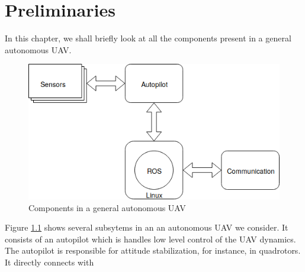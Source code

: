 
\chapter{Preliminaries} %

\label{Chapter5} %


In this chapter, we shall briefly look at all the components present in a general autonomous UAV.

\begin{figure}[h]
	\centering
	\includegraphics[scale=0.8]{Pictures/uav.png}
	\caption{Components in a general autonomous UAV}
	\label{fig: uav}
\end{figure}

Figure \ref{fig: uav} shows several subsytems in an an autonomous UAV we consider. It consists of an autopilot which is handles low level control of the UAV dynamics. The autopilot is responsible for attitude stabilization, for instance, in quadrotors. It directly connects with 
 
